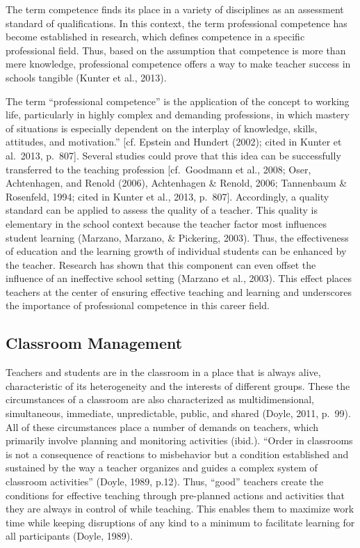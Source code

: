 \documentclass[
  man]{apa6}
\begin{document}
The term competence finds its place in a variety of disciplines as an assessment standard of qualifications. In this context, the term professional competence has become established in research, which defines competence in a specific professional field. Thus, based on the assumption that competence is more than mere knowledge, professional competence offers a way to make teacher success in schools tangible (Kunter et al., 2013).

The term ``professional competence'' is the application of the concept to working life, particularly in highly complex and demanding professions, in which mastery of situations is especially dependent on the interplay of knowledge, skills, attitudes, and motivation.'' {[}cf. Epstein and Hundert (2002); cited in Kunter et al.~2013, p.~807{]}. Several studies could prove that this idea can be successfully transferred to the teaching profession {[}cf.~Goodmann et al., 2008; Oser, Achtenhagen, and Renold (2006), Achtenhagen \& Renold, 2006; Tannenbaum \& Rosenfeld, 1994; cited in Kunter et al., 2013, p.~807{]}. Accordingly, a quality standard can be applied to assess the quality of a teacher. This quality is elementary in the school context because the teacher factor most influences student learning (Marzano, Marzano, \& Pickering, 2003). Thus, the effectiveness of education and the learning growth of individual students can be enhanced by the teacher. Research has shown that this component can even offset the influence of an ineffective school setting (Marzano et al., 2003). This effect places teachers at the center of ensuring effective teaching and learning and underscores the importance of professional competence in this career field.

\subsection{Classroom Management}\label{classroom-management}

Teachers and students are in the classroom in a place that is always alive, characteristic of its heterogeneity and the interests of different groups. These the circumstances of a classroom are also characterized as multidimensional, simultaneous, immediate, unpredictable, public, and shared (Doyle, 2011, p.~99). All of these circumstances place a number of demands on teachers, which primarily involve planning and monitoring activities (ibid.). ``Order in classrooms is not a consequence of reactions to misbehavior but a condition established and sustained by the way a teacher organizes and guides a complex system of classroom activities'' (Doyle, 1989, p.12). Thus, ``good'' teachers create the conditions for effective teaching through pre-planned actions and activities that they are always in control of while teaching. This enables them to maximize work time while keeping disruptions of any kind to a minimum to facilitate learning for all participants (Doyle, 1989).
\end{document}

